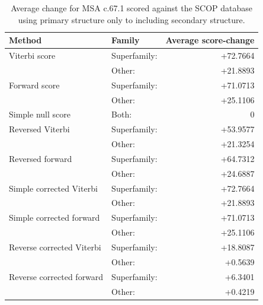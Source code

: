 \begin{table}[h!]
	\centering
\begin{tabular}{|llr|}
\hline
Method & Family & Average score-change \\ \hline

Viterbi score				& Superfamily: \qquad & +72.7664 \\  
    						& Other:       & +21.8893 \\ \hline
Forward score 				& Superfamily:\qquad & +71.0713 \\ 
   	 						& Other:       & +25.1106 \\ \hline
Simple null score 			& Both: 		& 0 \\ \hline
Reversed Viterbi 			& Superfamily: & +53.9577 \\ 
    						& Other:       & +21.3254 \\ \hline
Reversed forward  			& Superfamily: & +64.7312 \\ 
    						& Other:       & +24.6887 \\ \hline
Simple corrected Viterbi	& Superfamily: & +72.7664 \\ 
    						& Other:       & +21.8893 \\ \hline
Simple corrected forward	& Superfamily: & +71.0713  \\ 
    						& Other:       & +25.1106 \\ \hline
Reverse corrected Viterbi	& Superfamily: & +18.8087 \\ 
    						& Other:       & +0.5639 \\ \hline
Reverse corrected forward \qquad	& Superfamily: & +6.3401 \\ 
    						& Other:       & +0.4219 \\ \hline
\end{tabular}
	\caption[Average change for \acs{MSA} c.67.1 scored against the SCOP database.]{Average change for \acs{MSA} c.67.1 scored against the SCOP database using primary structure only to including secondary structure.}
	\label{tab:LST_Scores}
\end{table}

